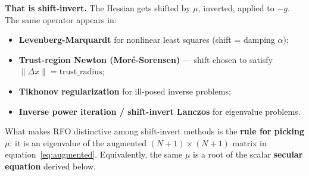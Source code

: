 \documentclass[11pt]{article}
\newcommand{\dx}{\Delta x}
\begin{document}
\textbf{That is shift-invert.}  The Hessian gets shifted by $\mu$, inverted,
applied to $-g$.  The same operator appears in:
\begin{itemize}
  \item \textbf{Levenberg-Marquardt} for nonlinear least squares (shift =
        damping $\alpha$);
  \item \textbf{Trust-region Newton (Mor\'e-Sorensen)} --- shift chosen to
        satisfy $\|\dx\| = \text{trust\_radius}$;
  \item \textbf{Tikhonov regularization} for ill-posed inverse problems;
  \item \textbf{Inverse power iteration / shift-invert Lanczos} for eigenvalue
        problems.
\end{itemize}

What makes RFO distinctive among shift-invert methods is the \textbf{rule for
picking $\mu$}: it is an eigenvalue of the augmented $(N+1) \times (N+1)$
matrix in equation~\eqref{eq:augmented}.  Equivalently, the same $\mu$ is a
root of the scalar \textbf{secular equation} derived below.
\end{document}
